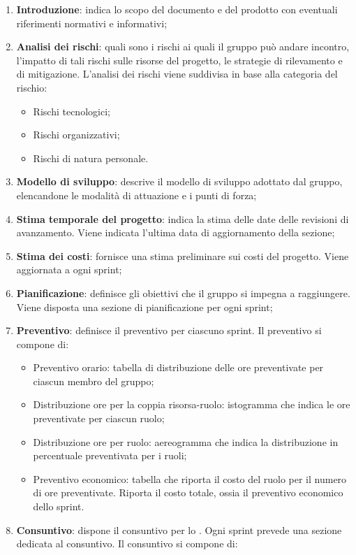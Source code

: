 \begin{enumerate}
  \item \textbf{Introduzione}: indica lo scopo del documento e del prodotto con eventuali riferimenti normativi e informativi;
  \item \textbf{Analisi dei rischi}: quali sono i rischi ai quali il gruppo può andare incontro, l'impatto di tali rischi sulle risorse del progetto, le strategie di rilevamento e di mitigazione. L'analisi dei rischi viene suddivisa in base alla categoria del rischio:
  \begin{itemize}
    \item Rischi tecnologici;
    \item Rischi organizzativi;
    \item Rischi di natura personale.
  \end{itemize}
  \item \textbf{Modello di sviluppo}: descrive il modello di sviluppo adottato dal gruppo, elencandone le modalità di attuazione e i punti di forza;
  \item \textbf{Stima temporale del progetto}: indica la stima delle date delle revisioni di avanzamento. Viene indicata l'ultima data di aggiornamento della sezione;
  \item \textbf{Stima dei costi}: fornisce una stima preliminare sui costi del progetto. Viene aggiornata a ogni sprint;
  \item \textbf{Pianificazione}: definisce gli obiettivi che il gruppo si impegna a raggiungere. Viene disposta una sezione di pianificazione per ogni sprint;
  \item \textbf{Preventivo}: definisce il preventivo per ciascuno sprint. Il preventivo si compone di:
  \begin{itemize}
    \item Preventivo orario: tabella di distribuzione delle ore preventivate per ciascun membro del gruppo;
    \item Distribuzione ore per la coppia risorsa-ruolo: istogramma che indica le ore preventivate per ciascun ruolo;
    \item Distribuzione ore per ruolo: aereogramma che indica la distribuzione in percentuale preventivata per i ruoli;
    \item Preventivo economico: tabella che riporta il costo del ruolo per il numero di ore preventivate. Riporta il costo totale, ossia il preventivo economico dello sprint.
  \end{itemize}
  \item \textbf{Consuntivo}: dispone il consuntivo per lo . Ogni sprint prevede una sezione dedicata al consuntivo. Il consuntivo si compone di:

\end{enumerate}
